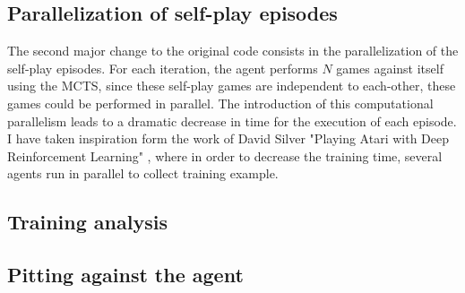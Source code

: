 \documentclass{article}
\begin{document}
\subsection{Parallelization of self-play episodes}
The second major change to the original code consists in the parallelization of the self-play episodes. For each iteration, the agent performs $N$ games against itself using the MCTS, since these self-play games are independent to each-other, these games could be performed in parallel. The introduction of this computational parallelism leads to a dramatic decrease in time for the execution of each episode. I have taken inspiration form the work of David Silver "Playing Atari with Deep Reinforcement Learning" \cite{mnih2013atari}, where in order to decrease the training time, several agents run in parallel to collect training example.

\subsection{Training analysis}

\subsection{Pitting against the agent}





\printbibliography
\end{document}
